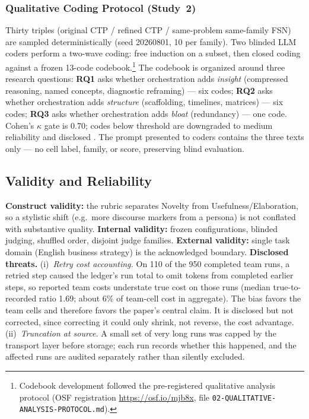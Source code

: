 \documentclass[12pt,a4paper]{article}
\begin{document}
\subsubsection{Qualitative Coding Protocol (Study~2)}\label{sec:qual-coding}

Thirty triples (original CTP / refined CTP / same-problem same-family FSN) are
sampled deterministically (seed 20260801, 10 per family). Two blinded LLM coders
perform a two-wave coding: free induction on a subset, then closed coding
against a frozen 13-code codebook.\footnote{Codebook development followed the
pre-registered qualitative analysis protocol (OSF registration
\url{https://osf.io/mjb8x}, file \texttt{02-QUALITATIVE-ANALYSIS-PROTOCOL.md}).} The codebook is organized
around three research questions: \textbf{RQ1} asks whether orchestration adds
\emph{insight} (compressed reasoning, named concepts, diagnostic reframing) ---
six codes; \textbf{RQ2} asks whether orchestration adds \emph{structure}
(scaffolding, timelines, matrices) --- six codes; \textbf{RQ3} asks whether
orchestration adds \emph{bloat} (redundancy) --- one code. Cohen's $\kappa$ gate is 0.70; codes below threshold
are downgraded to medium reliability and disclosed \citep{Cohen1960}. The prompt
presented to coders contains the three texts only --- no cell label, family, or
score, preserving blind evaluation.

\subsection{Validity and Reliability}

\textbf{Construct validity:} the rubric separates Novelty from
Usefulness/Elaboration, so a stylistic shift (e.g.\ more discourse markers from
a persona) is not conflated with substantive quality. \textbf{Internal validity:}
frozen configurations, blinded judging, shuffled order, disjoint judge families.
\textbf{External validity:} single task domain (English business strategy) is
the acknowledged boundary. \textbf{Disclosed threats.} (i)~\emph{Retry cost accounting.} On 110 of the 950
completed team runs, a retried step caused the ledger's run total to omit
tokens from completed earlier steps, so reported team costs understate true
cost on those runs (median true-to-recorded ratio 1.69; about 6\% of team-cell
cost in aggregate). The bias favors the team cells and therefore favors the
paper's central claim. It is disclosed but not corrected, since correcting it
could only shrink, not reverse, the cost advantage. (ii)~\emph{Truncation at source.} A small set of
very long runs was capped by the transport layer before storage; each run
records whether this happened, and the affected runs are audited separately
rather than silently excluded.
\end{document}
